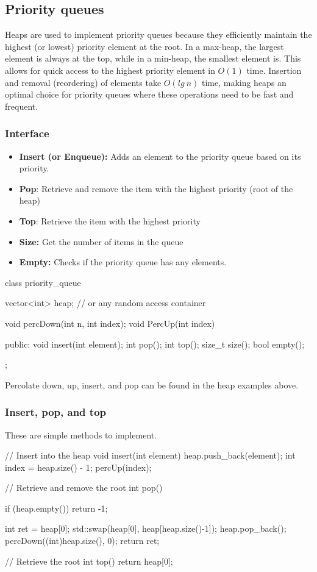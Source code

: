 \documentclass{report}
\begin{document}
\pagebreak 
\subsection{Priority queues}
\bigbreak \noindent 
Heaps are used to implement priority queues because they efficiently maintain the highest (or lowest) priority element at the root. In a max-heap, the largest element is always at the top, while in a min-heap, the smallest element is. This allows for quick access to the highest priority element in $O(1)$ time. Insertion and removal (reordering) of elements take $O(lg\ n)$ time, making heaps an optimal choice for priority queues where these operations need to be fast and frequent.
\bigbreak \noindent 
\subsubsection{Interface}
\bigbreak \noindent 
\begin{itemize}
    \item \textbf{Insert (or Enqueue):} Adds an element to the priority queue based on its priority.
    \item \textbf{Pop}: Retrieve and remove the item with the highest priority (root of the heap)
    \item \textbf{Top}: Retrieve the item with the highest priority
    \item \textbf{Size:} Get the number of items in the queue
    \item \textbf{Empty:} Checks if the priority queue has any elements.
\end{itemize}
\bigbreak \noindent 
\begin{cppcode}
    class priority_queue {
        vector<int> heap; // or any random access container

        void percDown(int n, int index);
        void PercUp(int index)

    public:
        void insert(int element);
        int pop();
        int top();
        size_t size();
        bool empty();
    };
\end{cppcode}
\bigbreak \noindent 
Percolate down, up, insert, and pop can be found in the heap examples above.

\pagebreak 
\subsubsection{Insert, pop, and top}
\bigbreak \noindent 
These are simple methods to implement.
\bigbreak \noindent 
\begin{cppcode}
    // Insert into the heap
    void insert(int element) {
        heap.push_back(element);
        int index = heap.size() - 1;
        percUp(index);
    }

    // Retrieve and remove the root
    int pop() {
        if (heap.empty()) return -1;

        int ret = heap[0];
        std::swap(heap[0], heap[heap.size()-1]);
        heap.pop_back();
        percDown((int)heap.size(), 0);
        return ret;
    }

    // Retrieve the root
    int top() {
        return heap[0];
    }
\end{cppcode}
\end{document}
